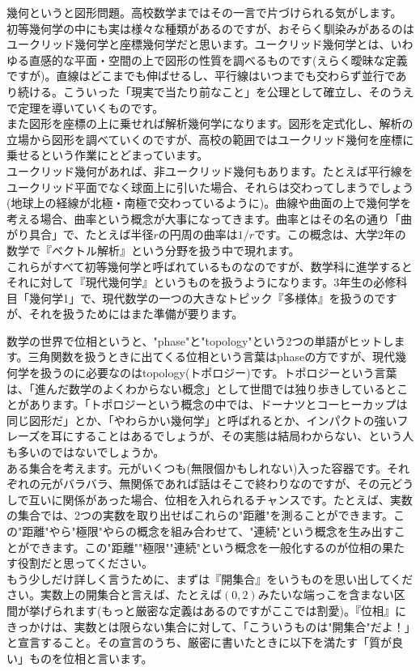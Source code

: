 幾何というと図形問題。高校数学まではその一言で片づけられる気がします。\\
初等幾何学の中にも実は様々な種類があるのですが、おそらく馴染みがあるのはユークリッド幾何学と座標幾何学だと思います。ユークリッド幾何学とは、いわゆる直感的な平面・空間の上で図形の性質を調べるものです(えらく曖昧な定義ですが)。直線はどこまでも伸ばせるし、平行線はいつまでも交わらず並行であり続ける。こういった「現実で当たり前なこと」を公理として確立し、そのうえで定理を導いていくものです。\\
また図形を座標の上に乗せれば解析幾何学になります。図形を定式化し、解析の立場から図形を調べていくのですが、高校の範囲ではユークリッド幾何を座標に乗せるという作業にとどまっています。\\
ユークリッド幾何があれば、非ユークリッド幾何もあります。たとえば平行線をユークリッド平面でなく球面上に引いた場合、それらは交わってしまうでしょう(地球上の経線が北極・南極で交わっているように)。曲線や曲面の上で幾何学を考える場合、曲率という概念が大事になってきます。曲率とはその名の通り「曲がり具合」で、たとえば半径$r$の円周の曲率は$1/r$です。この概念は、大学2年の数学で『ベクトル解析』という分野を扱う中で現れます。\\
これらがすべて初等幾何学と呼ばれているものなのですが、数学科に進学するとそれに対して『現代幾何学』というものを扱うようになります。3年生の必修科目「幾何学1」で、現代数学の一つの大きなトピック『多様体』を扱うのですが、それを扱うためにはまた準備が要ります。


数学の世界で位相というと、"phase"と"topology"という2つの単語がヒットします。三角関数を扱うときに出てくる位相という言葉はphaseの方ですが、現代幾何学を扱うのに必要なのはtopology(トポロジー)です。トポロジーという言葉は、「進んだ数学のよくわからない概念」として世間では独り歩きしているとことがあります。「トポロジーという概念の中では、ドーナツとコーヒーカップは同じ図形だ」とか、「やわらかい幾何学」と呼ばれるとか、インパクトの強いフレーズを耳にすることはあるでしょうが、その実態は結局わからない、という人も多いのではないでしょうか。\\
ある集合を考えます。元がいくつも(無限個かもしれない)入った容器です。それぞれの元がバラバラ、無関係であれば話はそこで終わりなのですが、その元どうしで互いに関係があった場合、位相を入れられるチャンスです。たとえば、実数の集合では、2つの実数を取り出せばこれらの"距離"を測ることができます。この"距離"やら"極限"やらの概念を組み合わせて、"連続"という概念を生み出すことができます。この"距離""極限""連続"という概念を一般化するのが位相の果たす役割だと思ってください。\\
もう少しだけ詳しく言うために、まずは『開集合』をいうものを思い出してください。実数上の開集合と言えば、たとえば$(0,2)$みたいな端っこを含まない区間が挙げられます(もっと厳密な定義はあるのですがここでは割愛)。『位相』にきっかけは、実数とは限らない集合に対して、「こういうものは"開集合"だよ！」と宣言すること。その宣言のうち、厳密に書いたときに以下を満たす「質が良い」ものを位相と言います。

